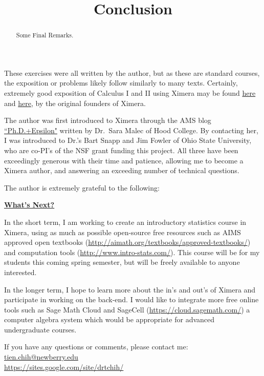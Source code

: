 \documentclass{ximera}
\title{Conclusion}
\begin{document}
      
\begin{abstract}
      
Some Final Remarks.      
\end{abstract}
      
\maketitle
      
      
These exercises were all written by the author, but as these are standard courses, the exposition or problems likely follow similarly to many texts.  Certainly, extremely good exposition of Calculus I and II using Ximera may be found \href{http://ximera.osu.edu/course/mooculus/calculus1/}{here} and \href{http://ximera.osu.edu/course/mooculus/calculus2/}{here}, by the original founders of Ximera.

The author was first introduced to Ximera through the AMS blog \href{http://blogs.ams.org/phdplus/2016/08/31/the-ximera-project-turning-latex-into-interactive-websites/#sthash.b9OeivZv.dpbs}{``Ph.D.+Epsilon"} written by Dr.\  Sara Malec of Hood College.  By contacting her, I was introduced to Dr.'s Bart Snapp and Jim Fowler of Ohio State University, who are co-PI's of the NSF grant funding this project.  All three have been exceedingly generous with their time and patience, allowing me to become a Ximera author, and answering an exceeding number of technical questions.

\begin{question}
The author is extremely grateful to the following:
\begin{selectAll}



\end{selectAll}
\end{question}

\textbf{\underline{What's Next?}}

In the short term, I am working to create an introductory statistics course in Ximera, using as much as possible open-source free resources such as AIMS approved open textbooks (\url{http://aimath.org/textbooks/approved-textbooks/}) and computation tools (\url{http://www.intro-stats.com/}).  This course will be for my students this coming spring semester, but will be freely available to anyone interested.

In the longer term, I hope to learn more about the in's and out's of Ximera and participate in working on the back-end.  I would like to integrate more free online tools such as Sage Math Cloud and SageCell (\url{https://cloud.sagemath.com/}) a computer algebra system which would be appropriate for advanced undergraduate courses.

If you have any questions or comments, please contact me:\\
\href{mailto:tien.chih@newberry.edu}{tien.chih@newberry.edu}\\
\url{https://sites.google.com/site/drtchih/}
\end{document}
